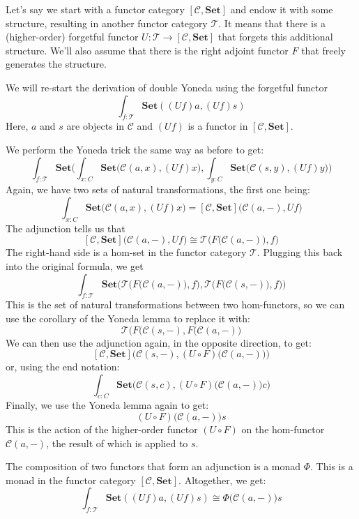 \documentclass[11pt]{amsart}
\begin{document}
Let's say we start with a functor category $[\mathcal{C}, \mathbf{Set}]$ and endow it with some structure, resulting in another functor category $\mathcal{T}$. It means that there is a (higher-order) forgetful functor $U \colon \mathcal{T} \to [\mathcal{C}, \mathbf{Set}]$ that forgets this additional structure. We'll also assume that there is the right adjoint functor $F$ that freely generates the structure.

We will re-start the derivation of double Yoneda using the forgetful functor
\[ \int_{f \colon \mathcal{T}} \mathbf{Set}( (U f) a, (U f) s)\]
Here, $a$ and $s$ are objects in $\mathcal{C}$ and $(U f)$ is a functor in $[\mathcal{C}, \mathbf{Set}]$.

We perform the Yoneda trick the same way as before to get:
\[  \int_{f \colon \mathcal{T}}  \mathbf{Set}\Big(\int_{x \colon C} \mathbf{Set}\big(\mathcal{C}(a, x),(U f) x), \int_{y \colon C} \mathbf{Set}\big(\mathcal{C}(s, y),(U f) y\big)\Big)\]
Again, we have two sets of natural transformations, the first one being: 
\[\int_{x \colon C} \mathbf{Set}\big(\mathcal{C}(a, x), (U f) x\big) = [\mathcal{C}, \mathbf{Set}]\big(\mathcal{C}(a, -), U f\big)\]
The adjunction tells us that
\[ [\mathcal{C}, \mathbf{Set}]\big(\mathcal{C}(a, -), U f\big) \cong \mathcal{T}\Big(F\big(\mathcal{C}(a, -)\big), f\Big)\]
The right-hand side is a hom-set in the functor category $\mathcal{T}$. Plugging this back into the original formula, we get 
\[  \int_{f \colon \mathcal{T}}  \mathbf{Set}\Big(\mathcal{T}\Big(F\big(\mathcal{C}(a, -)\big), f\Big), \mathcal{T}\Big(F\big(\mathcal{C}(s, -)\big), f\Big) \Big)\]
This is the set of natural transformations between two hom-functors, so we can use the corollary of the Yoneda lemma to replace it with:
\[ \mathcal{T}\Big( F\big(\mathcal{C}(s, -), F\big(\mathcal{C}(a, -) \Big) \]
We can then use the adjunction again, in the opposite direction, to get:
\[  [\mathcal{C}, \mathbf{Set}] \Big( \mathcal{C}(s, -), (U \circ F)\big(\mathcal{C}(a, -)\big) \Big) \]
or, using the end notation:
\[ \int_{c \colon C} \mathbf{Set} \Big(\mathcal{C}(s, c), (U \circ F)\big(\mathcal{C}(a, -)\big) c \Big) \]
Finally, we use the Yoneda lemma again to get:
\[ (U \circ F) \big( \mathcal{C}(a, -) \big) s \]
This is the action of the higher-order functor $(U \circ F)$ on the hom-functor $\mathcal{C}(a, -)$, the result of which is applied to $s$.

The composition of two functors that form an adjunction is a monad $\Phi$. This is a monad in the functor category $[\mathcal{C}, \mathbf{Set}]$. Altogether, we get:
\[ \int_{f \colon \mathcal{T}} \mathbf{Set}( (U f) a, (U f) s) \cong \Phi \big( \mathcal{C}(a, -) \big) s \]
\end{document}
